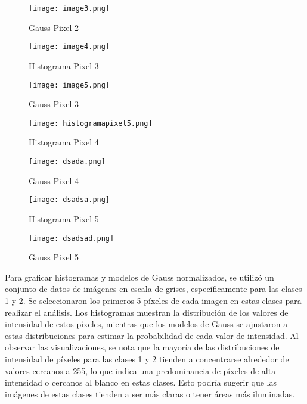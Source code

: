 \documentclass[spanish]{article}
\begin{document}
\begin{enumerate}
\begin{enumerate}
\begin{figure}[h]
    \centering
    \texttt{[image: image3.png]}
    \caption{Gauss Pixel 2}
    \label{fig:enter-label}
\end{figure}

\newpage


\begin{figure}[h]
    \centering
    \texttt{[image: image4.png]}
    \caption{Histograma Pixel 3}
    \label{fig:enter-label}
\end{figure}

\begin{figure}[h]
    \centering
    \texttt{[image: image5.png]}
    \caption{Gauss Pixel 3}
    \label{fig:enter-label}
\end{figure}

\newpage


\begin{figure}[h]
    \centering
    \texttt{[image: histogramapixel5.png]}
    \caption{Histograma Pixel 4}
    \label{fig:enter-label}
\end{figure}

\begin{figure}[h]
    \centering
    \texttt{[image: dsada.png]}
    \caption{Gauss Pixel 4}
    \label{fig:enter-label}
\end{figure}

\newpage


\begin{figure}[h]
    \centering
    \texttt{[image: dsadsa.png]}
    \caption{Histograma Pixel 5}
    \label{fig:enter-label}
\end{figure}

\begin{figure}[h]
    \centering
    \texttt{[image: dsadsad.png]}
    \caption{Gauss Pixel 5}
    \label{fig:enter-label}
\end{figure}


\par Para graficar histogramas y modelos de Gauss normalizados, se utilizó un conjunto de datos de imágenes en escala de grises, específicamente para las clases 1 y 2. Se seleccionaron los primeros 5 píxeles de cada imagen en estas clases para realizar el análisis. Los histogramas muestran la distribución de los valores de intensidad de estos píxeles, mientras que los modelos de Gauss se ajustaron a estas distribuciones para estimar la probabilidad de cada valor de intensidad.
Al observar las visualizaciones, se nota que la mayoría de las distribuciones de intensidad de píxeles para las clases 1 y 2 tienden a concentrarse alrededor de valores cercanos a 255, lo que indica una predominancia de píxeles de alta intensidad o cercanos al blanco en estas clases. Esto podría sugerir que las imágenes de estas clases tienden a ser más claras o tener áreas más iluminadas.



\end{enumerate}
\end{enumerate}
\end{document}
